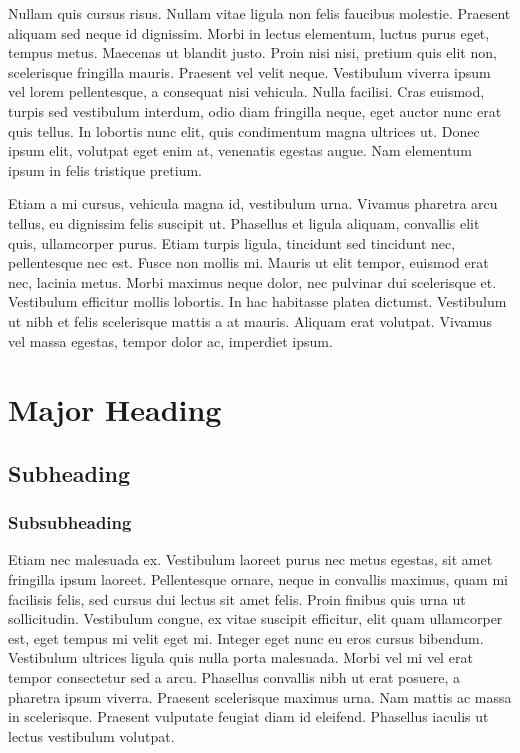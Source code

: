 \documentclass[12pt]{article}
\begin{document}
Nullam quis cursus risus. Nullam vitae ligula non felis faucibus molestie. Praesent aliquam sed neque id dignissim. Morbi in lectus elementum, luctus purus eget, tempus metus. Maecenas ut blandit justo. Proin nisi nisi, pretium quis elit non, scelerisque fringilla mauris. Praesent vel velit neque. Vestibulum viverra ipsum vel lorem pellentesque, a consequat nisi vehicula. Nulla facilisi. Cras euismod, turpis sed vestibulum interdum, odio diam fringilla neque, eget auctor nunc erat quis tellus. In lobortis nunc elit, quis condimentum magna ultrices ut. Donec ipsum elit, volutpat eget enim at, venenatis egestas augue. Nam elementum ipsum in felis tristique pretium.

Etiam a mi cursus, vehicula magna id, vestibulum urna. Vivamus pharetra arcu tellus, eu dignissim felis suscipit ut. Phasellus et ligula aliquam, convallis elit quis, ullamcorper purus. Etiam turpis ligula, tincidunt sed tincidunt nec, pellentesque nec est. Fusce non mollis mi. Mauris ut elit tempor, euismod erat nec, lacinia metus. Morbi maximus neque dolor, nec pulvinar dui scelerisque et. Vestibulum efficitur mollis lobortis. In hac habitasse platea dictumst. Vestibulum ut nibh et felis scelerisque mattis a at mauris. Aliquam erat volutpat. Vivamus vel massa egestas, tempor dolor ac, imperdiet ipsum.

\section*{Major Heading}
\subsection*{Subheading}
\subsubsection*{Subsubheading}
Etiam nec malesuada ex. Vestibulum laoreet purus nec metus egestas, sit amet fringilla ipsum laoreet. Pellentesque ornare, neque in convallis maximus, quam mi facilisis felis, sed cursus dui lectus sit amet felis. Proin finibus quis urna ut sollicitudin. Vestibulum congue, ex vitae suscipit efficitur, elit quam ullamcorper est, eget tempus mi velit eget mi. Integer eget nunc eu eros cursus bibendum. Vestibulum ultrices ligula quis nulla porta malesuada. Morbi vel mi vel erat tempor consectetur sed a arcu. Phasellus convallis nibh ut erat posuere, a pharetra ipsum viverra. Praesent scelerisque maximus urna. Nam mattis ac massa in scelerisque. Praesent vulputate feugiat diam id eleifend. Phasellus iaculis ut lectus vestibulum volutpat.
\end{document}
